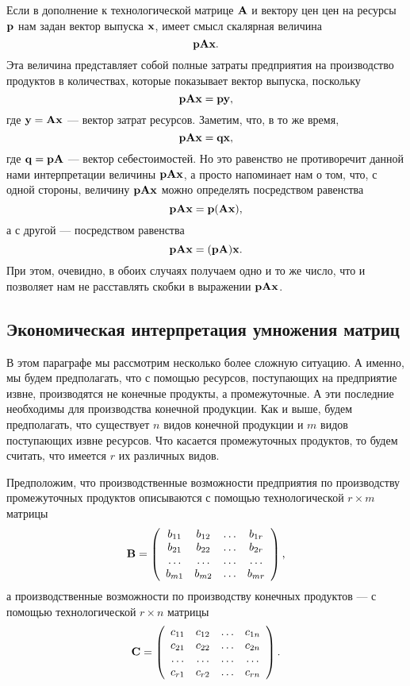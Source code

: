     Если в дополнение к технологической матрице $\mathbf{A}$ и вектору
    цен цен на ресурсы $\mathbf{p}$ нам задан вектор выпуска $\mathbf{x}$,
    имеет смысл скалярная величина
    \[\mathbf{p}\mathbf{A}\mathbf{x}.\]
    Эта величина представляет собой полные затраты предприятия на
    производство продуктов в количествах, которые показывает вектор
    выпуска, поскольку
    \[\mathbf{p}\mathbf{A}\mathbf{x}=\mathbf{p}\mathbf{y},\]
    где $\mathbf{y}=\mathbf{A}\mathbf{x}$ --- вектор затрат ресурсов. Заметим,
    что, в то же время,
    \[\mathbf{p}\mathbf{A}\mathbf{x}=\mathbf{q}\mathbf{x},\]
    где $\mathbf{q}=\mathbf{p}\mathbf{A}$ --- вектор себестоимостей. Но это
    равенство не противоречит данной нами интерпретации величины
    $\mathbf{p}\mathbf{A}\mathbf{x}$, а просто напоминает нам о том, что, с
    одной стороны, величину $\mathbf{p}\mathbf{A}\mathbf{x}$ можно определять
    посредством равенства
    \[\mathbf{p}\mathbf{A}\mathbf{x}=\mathbf{p}(\mathbf{A}\mathbf{x}),\]
    а с другой --- посредством равенства
    \[\mathbf{p}\mathbf{A}\mathbf{x}=(\mathbf{p}\mathbf{A})\mathbf{x}.\]
    При этом, очевидно, в обоих случаях получаем одно и то
    же число, что и позволяет нам не расставлять скобки
    в выражении $\mathbf{p}\mathbf{A}\mathbf{x}$.


\subsection{Экономическая интерпретация умножения матриц}

    В этом параграфе мы рассмотрим несколько более сложную
    ситуацию. А именно, мы будем предполагать, что с помощью
    ресурсов, поступающих на предприятие извне, производятся не конечные
    продукты, а промежуточные. А эти последние необходимы для
    производства конечной продукции. Как и выше, будем предполагать,
    что существует $n$ видов конечной продукции и $m$ видов
    поступающих извне ресурсов. Что касается промежуточных
    продуктов, то будем считать, что имеется $r$ их  различных видов.

    Предположим, что производственные возможности предприятия
    по производству промежуточных продуктов описываются с помощью
    технологической $r \times m$ матрицы
    \[\mathbf{B}=\left(
\begin{array}{cccc}
   b_{11} & b_{12} & \ldots & b_{1r} \\
   b_{21} & b_{22} & \ldots & b_{2r} \\
   \ldots& \ldots &\ldots &\ldots \\
   b_{m1} & b_{m2} & \ldots & b_{mr}
\end{array}
\right),\]
    а производственные возможности
    по производству конечных продуктов --- с помощью
    технологической $r \times n$ матрицы
    \[\mathbf{C}=\left(
\begin{array}{cccc}
   c_{11} & c_{12} & \ldots & c_{1n} \\
   c_{21} & c_{22} & \ldots & c_{2n} \\
   \ldots& \ldots &\ldots &\ldots \\
   c_{r1} & c_{r2} & \ldots & c_{rn}
\end{array}
\right).\]

